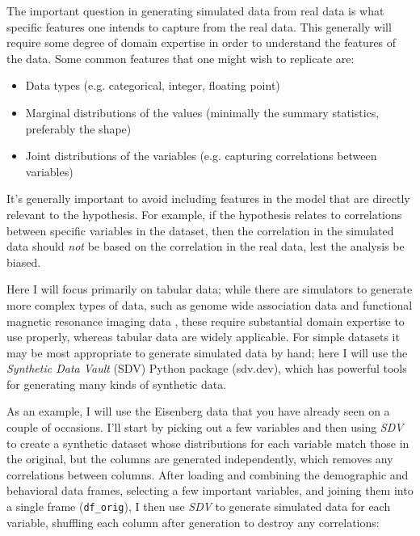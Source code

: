 The important question in generating simulated data from real data is what specific features one intends to capture from the real data. This generally will require some degree of domain expertise in order to understand the features of the data.  Some common features that one might wish to replicate are:

\begin{itemize}
\item Data types (e.g. categorical, integer, floating point)
\item Marginal distributions of the values (minimally the summary statistics, preferably the shape)
\item Joint distributions of the variables (e.g. capturing correlations between variables)
\end{itemize}

It's generally important to avoid including features in the model that are directly relevant to the hypothesis.  For example, if the hypothesis relates to correlations between specific variables in the dataset, then the correlation in the simulated data should \textit{not} be based on the correlation in the real data, lest the analysis be biased.

Here I will focus primarily on tabular data; while there are simulators to generate more complex types of data, such as genome wide association data \citep{Purcell:2007aa} and functional magnetic resonance imaging data \citep{Ellis:2020aa}, these require substantial domain expertise to use properly, whereas tabular data are widely applicable.  For simple datasets it may be most appropriate to generate simulated data by hand; here I will use the \textit{Synthetic Data Vault} (SDV) Python package (sdv.dev), which has powerful tools for generating many kinds of synthetic data.

As an example, I will use the Eisenberg data that you have already seen on a couple of occasions. I'll start by picking out a few variables and then using \textit{SDV} to create a synthetic dataset whose distributions for each variable match those in the original, but the columns are generated independently, which removes any correlations between columns. After loading and combining the demographic and behavioral data frames, selecting a few important variables, and joining them into a single frame (\texttt{df\_orig}), I then use \textit{SDV} to generate simulated data for each variable, shuffling each column after generation to destroy any correlations:

